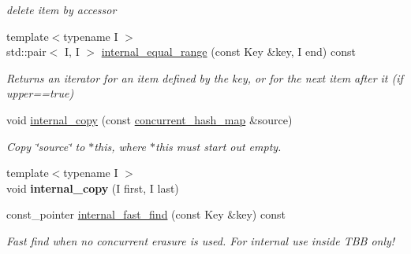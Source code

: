 \begin{DoxyCompactItemize}
\begin{DoxyCompactList}\small\item\em delete item by accessor \end{DoxyCompactList}\item 
\hypertarget{classtbb_1_1interface5_1_1concurrent__hash__map_a8603f5288db63ec35a16844427e97e42}{}{\footnotesize template$<$typename I $>$ }\\std\+::pair$<$ I, I $>$ \hyperlink{classtbb_1_1interface5_1_1concurrent__hash__map_a8603f5288db63ec35a16844427e97e42}{internal\+\_\+equal\+\_\+range} (const Key \&key, I end) const \label{classtbb_1_1interface5_1_1concurrent__hash__map_a8603f5288db63ec35a16844427e97e42}

\begin{DoxyCompactList}\small\item\em Returns an iterator for an item defined by the key, or for the next item after it (if upper==true) \end{DoxyCompactList}\item 
\hypertarget{classtbb_1_1interface5_1_1concurrent__hash__map_a0bc3593f82b3b4f9839fc051780212ab}{}void \hyperlink{classtbb_1_1interface5_1_1concurrent__hash__map_a0bc3593f82b3b4f9839fc051780212ab}{internal\+\_\+copy} (const \hyperlink{classtbb_1_1interface5_1_1concurrent__hash__map}{concurrent\+\_\+hash\+\_\+map} \&source)\label{classtbb_1_1interface5_1_1concurrent__hash__map_a0bc3593f82b3b4f9839fc051780212ab}

\begin{DoxyCompactList}\small\item\em Copy \char`\"{}source\char`\"{} to $\ast$this, where $\ast$this must start out empty. \end{DoxyCompactList}\item 
\hypertarget{classtbb_1_1interface5_1_1concurrent__hash__map_a31e69cc4fd5adafb379e7c6de5660912}{}{\footnotesize template$<$typename I $>$ }\\void {\bfseries internal\+\_\+copy} (I first, I last)\label{classtbb_1_1interface5_1_1concurrent__hash__map_a31e69cc4fd5adafb379e7c6de5660912}

\item 
const\+\_\+pointer \hyperlink{classtbb_1_1interface5_1_1concurrent__hash__map_adddfc01df4dc3681ab2bfaf910455e1f}{internal\+\_\+fast\+\_\+find} (const Key \&key) const 
\begin{DoxyCompactList}\small\item\em Fast find when no concurrent erasure is used. For internal use inside T\+B\+B only! \end{DoxyCompactList}\end{DoxyCompactItemize}
